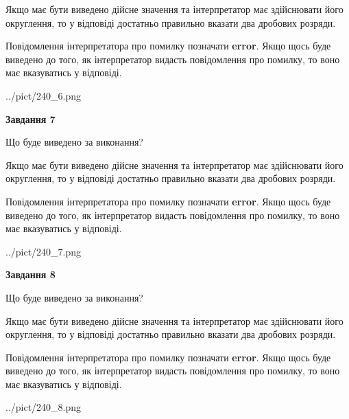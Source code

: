 \documentclass[12pt, ukrainian]{article}
\begin{document}
{\begin {Large}
Якщо має бути виведено дійсне значення та інтерпретатор має здійснювати його округлення, 
то у відповіді достатньо правильно вказати два дробових розряди.

Повідомлення інтерпретатора про помилку позначати \textbf{error}.
Якщо щось буде виведено до того, як інтерпретатор видасть повідомлення про помилку, 
то воно має вказуватись у відповіді. \par

\begin{center}
	{../pict/240_6.png}
\end{center}
\newpage

{\begin {center}\textbf{Завдання 7}\end {center}}\par
Що буде виведено за виконання? \par

Якщо має бути виведено дійсне значення та інтерпретатор має здійснювати його округлення, 
то у відповіді достатньо правильно вказати два дробових розряди.

Повідомлення інтерпретатора про помилку позначати \textbf{error}.
Якщо щось буде виведено до того, як інтерпретатор видасть повідомлення про помилку, 
то воно має вказуватись у відповіді. \par

\begin{center}
	{../pict/240_7.png}
\end{center}
\newpage

{\begin {center}\textbf{Завдання 8}\end {center}}\par
Що буде виведено за виконання? \par

Якщо має бути виведено дійсне значення та інтерпретатор має здійснювати його округлення, 
то у відповіді достатньо правильно вказати два дробових розряди.

Повідомлення інтерпретатора про помилку позначати \textbf{error}.
Якщо щось буде виведено до того, як інтерпретатор видасть повідомлення про помилку, 
то воно має вказуватись у відповіді. \par

\begin{center}
	{../pict/240_8.png}
\end{center}
\newpage


\end{Large}}
\end{document}
